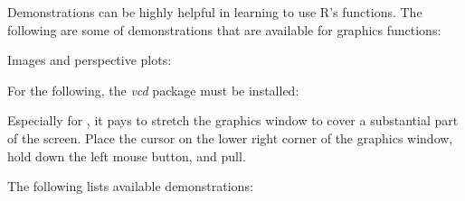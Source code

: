 Demonstrations can be highly helpful in learning to use R's functions.
The following are some of demonstrations that are available for
graphics functions:
\begin{marginfigure}
Images and perspective plots:
\begin{knitrout}
\color{fgcolor}\begin{kframe}
\begin{alltt}
\end{alltt}
\end{kframe}
\end{knitrout}
\end{marginfigure}
\begin{knitrout}
\color{fgcolor}\begin{kframe}
\begin{alltt}
   
\end{alltt}
\end{kframe}
\end{knitrout}

\begin{marginfigure}For the following, the {\em vcd} package must be installed:
\begin{knitrout}
\color{fgcolor}\begin{kframe}
\begin{alltt}
\end{alltt}
\end{kframe}
\end{knitrout}
\end{marginfigure}

Especially for , it pays to stretch the graphics
window to cover a substantial part of the screen.  Place the cursor on
the lower right corner of the graphics window, hold down the left
mouse button, and pull.

The following lists available demonstrations:
\begin{knitrout}
\color{fgcolor}\begin{kframe}
\begin{alltt}
\hlstd{()}
\hlstd{(} \hlstd{=} \hlstd{(} \hlstd{=} \hlstd{))}
\end{alltt}
\end{kframe}
\end{knitrout}


